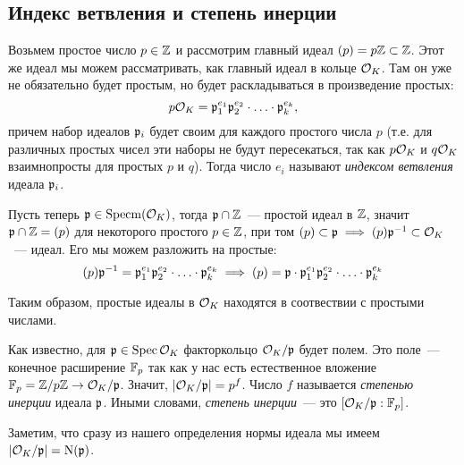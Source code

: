 	\subsection{Индекс ветвления и степень инерции}

	\begin{definition} 
		Возьмем простое число $p \in \mathbb{Z}$ и рассмотрим главный идеал $(p) = p\mathbb{Z} \subset \mathbb{Z}$. Этот же идеал мы можем рассматривать, как главный идеал в кольце $\mathcal{O}_{K}$. Там он уже не обязательно будет простым, но будет раскладываться в произведение простых: 
	\[
		p\mathcal{O}_{K} = \mathfrak{p}_{1}^{e_1} \mathfrak{p}_{2}^{e_2} \cdot \ldots \cdot \mathfrak{p}_{k}^{e_k},
	\]
	причем набор идеалов $\mathfrak{p}_{i}$ будет своим для каждого простого числа $p$ (т.е. для различных простых чисел эти наборы не будут пересекаться, так как $p \mathcal{O}_{K}$ и $q\mathcal{O}_{K}$ взаимнопросты для простых $p$ и $q$). Тогда число $e_i$ называют \emph{индексом ветвления} идеала $\mathfrak{p}_{i}$. 
	\end{definition}

	
	Пусть теперь $\mathfrak{p} \in \operatorname{Specm}(\mathcal{O}_{K})$, тогда $\mathfrak{p} \cap \mathbb{Z}$~--- простой идеал в $\mathbb{Z}$, значит $\mathfrak{p} \cap \mathbb{Z} = (p)$ для некоторого простого $p \in \mathbb{Z}$, при том $(p) \subset \mathfrak{p} \implies (p)\mathfrak{p}^{-1} \subset \mathcal{O}_{K}$~--- идеал. Его мы можем разложить на простые: 
	\[
	 	(p)\mathfrak{p}^{-1} = \mathfrak{p}_{1}^{e_1} \mathfrak{p}_{2}^{e_2} \cdot \ldots \cdot \mathfrak{p}_{k}^{e_k} \implies  (p) = \mathfrak{p} \cdot \mathfrak{p}_{1}^{e_1} \mathfrak{p}_{2}^{e_2} \cdot \ldots \cdot \mathfrak{p}_{k}^{e_k}
	 \] 

	Таким образом, простые идеалы в $\mathcal{O}_{K}$ находятся в соотвествии с простыми числами. 

	

	\begin{definition} 
		Как известно, для $\mathfrak{p} \in \operatorname{Spec}{\mathcal{O}_{K}}$ факторкольцо $\mathcal{O}_{K}/\mathfrak{p}$ будет полем. Это поле~--- конечное расширение $\mathbb{F}_{p}$ так как у нас есть естественное вложение $\mathbb{F}_{p}  = \mathbb{Z}/p\mathbb{Z} \to \mathcal{O}_{K}/\mathfrak{p}$. Значит, $\left\lvert \mathcal{O}_{K}/\mathfrak{p} \right\rvert = p^{f}$. Число $f$ называется \emph{степенью инерции} идеала $\mathfrak{p}$. Иными словами, \emph{степень инерции}~--- это $[\mathcal{O}_{K}/\mathfrak{p} : \mathbb{F}_{p}]$.
	\end{definition}

	\begin{remark}
		Заметим, что сразу из нашего определения нормы идеала мы имеем $|\mathcal{O}_{K}/\mathfrak{p}| = \operatorname{\mathrm{N}}(\mathfrak{p})$.
	\end{remark}

